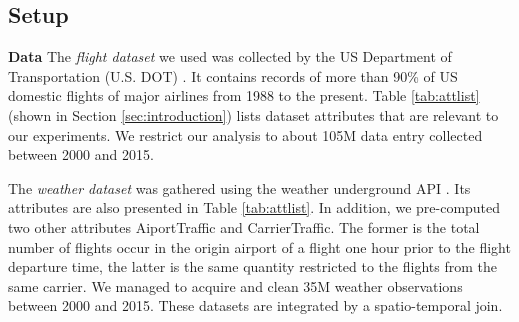 \vspace{-.2cm}

\subsection{Setup}
\label{sec:setup}


{\bf Data} The {\em flight dataset} we used was collected by the US
Department of Transportation (U.S. DOT) \cite{flightdata}. It contains
records of more than 90\% of US domestic flights of major airlines
from 1988 to the present. Table \ref{tab:attlist}(shown in Section
\ref{sec:introduction}) lists dataset attributes that are relevant to
our experiments.  We restrict our analysis to about 105M data entry
collected between 2000 and 2015.

The {\em weather dataset} was gathered using the weather underground
API \cite{Weatherdata}.  Its attributes are also presented in Table
\ref{tab:attlist}. In addition, we pre-computed two other attributes
AiportTraffic and CarrierTraffic. The former is the total number of
flights occur in the origin airport of a flight one hour prior to the
flight departure time, the latter is the same quantity restricted to
the flights from the same carrier.  We managed to acquire and clean
35M weather observations between 2000 and 2015. These datasets are
integrated by a spatio-temporal join.










